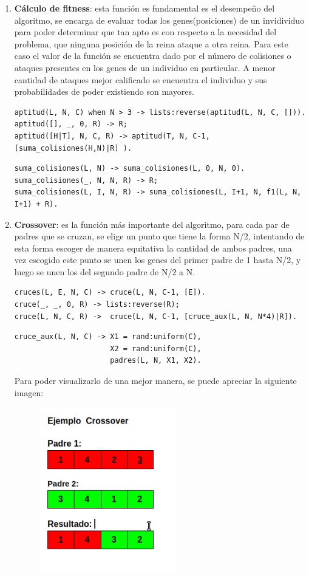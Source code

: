 \documentclass[12pt,a4paper]{article}
\begin{document}
\begin{enumerate}
\begin{enumerate}
\item \textbf{Cálculo de fitness}: esta función es fundamental es el desempeño del algoritmo, se encarga de evaluar todas los genes(posiciones) de un invidividuo para poder determinar que tan apto es con respecto a la necesidad del problema, que ninguna posición de la reina ataque a otra reina. Para este caso el valor de la función se encuentra dado por el número de colisiones o ataques presentes en los genes de un individuo en particular. A menor cantidad de ataques mejor calificado se encuentra el individuo y sus probabilidades de poder existiendo son mayores.
\begin{verbatim}
aptitud(L, N, C) when N > 3 -> lists:reverse(aptitud(L, N, C, [])).
aptitud([], _, 0, R) -> R;
aptitud([H|T], N, C, R) -> aptitud(T, N, C-1, [suma_colisiones(H,N)|R] ).
\end{verbatim}
\begin{verbatim}
suma_colisiones(L, N) -> suma_colisiones(L, 0, N, 0).
suma_colisiones(_, N, N, R) -> R;
suma_colisiones(L, I, N, R) -> suma_colisiones(L, I+1, N, f1(L, N, I+1) + R).
\end{verbatim}
\item \textbf{Crossover}: es la función más importante del algoritmo, para cada par de padres que se cruzan, se elige un punto que  tiene la forma N/2, intentando de esta forma escoger de manera equitativa la cantidad de ambos padres, una vez escogido este punto se unen los genes del primer padre de 1 hasta N/2, y luego se unen los del segundo padre de N/2 a N.
\begin{verbatim}
cruces(L, E, N, C) -> cruce(L, N, C-1, [E]).
cruce(_, _, 0, R) -> lists:reverse(R);
cruce(L, N, C, R) ->  cruce(L, N, C-1, [cruce_aux(L, N, N*4)|R]).
\end{verbatim}
\begin{verbatim}
cruce_aux(L, N, C) -> X1 = rand:uniform(C),
                      X2 = rand:uniform(C), 
                      padres(L, N, X1, X2).
\end{verbatim}
Para poder visualizarlo de una mejor manera, se puede apreciar la siguiente imagen:
\begin{figure}[htp]
\centering
\includegraphics[width=6cm]{imagenes/g2.png} 

\end{figure}
\end{enumerate}
\end{enumerate}
\end{document}
